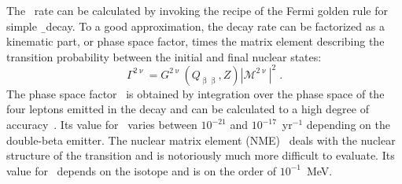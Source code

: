The \nnbb\ rate can be calculated by invoking the recipe of the Fermi golden rule for
simple \b\ decay. To a good approximation, the decay rate can be factorized as a kinematic
part, or phase space factor, times the matrix element describing the transition
probability between the initial and final nuclear states:
\[
  \Gamma^{2\upnu} = G^{2\upnu}(Q_{\upbeta\upbeta},Z) |\mathcal{M}^{2\upnu}|^2 \;.
\]
The phase space factor \psft\ is obtained by integration over the phase space of the four
leptons emitted in the decay and can be calculated to a high degree of
accuracy~\cite{Kotila2012, Stoica2013}. Its value for \nnbb\ varies between $10^{-21}$ and
$10^{-17}$~yr$^{-1}$ depending on the double-beta emitter.  The nuclear matrix element
(NME) \nmet\ deals with the nuclear structure of the transition and is notoriously much
more difficult to evaluate. Its value for \nnbb\ depends on the isotope and is on the
order of $10^{-1}$~MeV.

